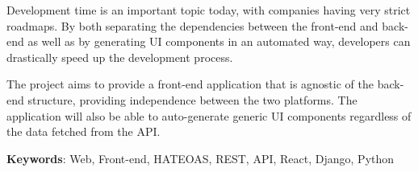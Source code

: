 
Development time is an important topic today, with companies having very strict roadmaps. By both separating the dependencies between the front-end and back-end as well as by generating UI components in an automated way, developers can drastically speed up the development process.

The project aims to provide a front-end application that is agnostic of the back-end structure, providing independence between the two platforms. The application will also be able to auto-generate generic UI components regardless of the data fetched from the API.

\textbf{Keywords}: Web, Front-end, HATEOAS, REST, API, React, Django, Python